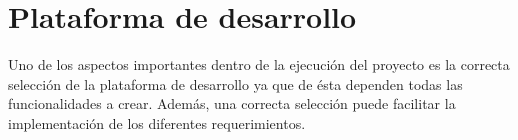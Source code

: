 



	






	
		

		
		
		
		

\section{Plataforma de desarrollo}
Uno de los aspectos importantes dentro de la ejecución del proyecto es la correcta selección de la plataforma de desarrollo ya que de ésta dependen todas las funcionalidades a crear. Además, una correcta selección puede facilitar  la implementación de los diferentes requerimientos.

